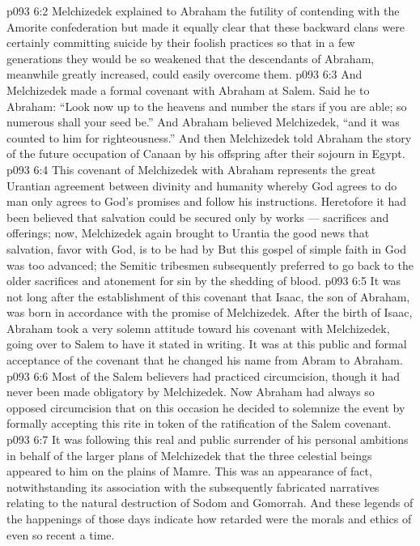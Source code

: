 \vs p093 6:2 Melchizedek explained to Abraham the futility of contending with the Amorite confederation but made it equally clear that these backward clans were certainly committing suicide by their foolish practices so that in a few generations they would be so weakened that the descendants of Abraham, meanwhile greatly increased, could easily overcome them.
\vs p093 6:3 And Melchizedek made a formal covenant with Abraham at Salem. Said he to Abraham: “Look now up to the heavens and number the stars if you are able; so numerous shall your seed be.” And Abraham believed Melchizedek, “and it was counted to him for righteousness.” And then Melchizedek told Abraham the story of the future occupation of Canaan by his offspring after their sojourn in Egypt.
\vs p093 6:4 \pc This covenant of Melchizedek with Abraham represents the great Urantian agreement between divinity and humanity whereby God agrees to do  man only agrees to  God’s promises and follow his instructions. Heretofore it had been believed that salvation could be secured only by works --- sacrifices and offerings; now, Melchizedek again brought to Urantia the good news that salvation, favor with God, is to be had by  But this gospel of simple faith in God was too advanced; the Semitic tribesmen subsequently preferred to go back to the older sacrifices and atonement for sin by the shedding of blood.
\vs p093 6:5 It was not long after the establishment of this covenant that Isaac, the son of Abraham, was born in accordance with the promise of Melchizedek. After the birth of Isaac, Abraham took a very solemn attitude toward his covenant with Melchizedek, going over to Salem to have it stated in writing. It was at this public and formal acceptance of the covenant that he changed his name from Abram to Abraham.
\vs p093 6:6 Most of the Salem believers had practiced circumcision, though it had never been made obligatory by Melchizedek. Now Abraham had always so opposed circumcision that on this occasion he decided to solemnize the event by formally accepting this rite in token of the ratification of the Salem covenant.
\vs p093 6:7 It was following this real and public surrender of his personal ambitions in behalf of the larger plans of Melchizedek that the three celestial beings appeared to him on the plains of Mamre. This was an appearance of fact, notwithstanding its association with the subsequently fabricated narratives relating to the natural destruction of Sodom and Gomorrah. And these legends of the happenings of those days indicate how retarded were the morals and ethics of even so recent a time.
